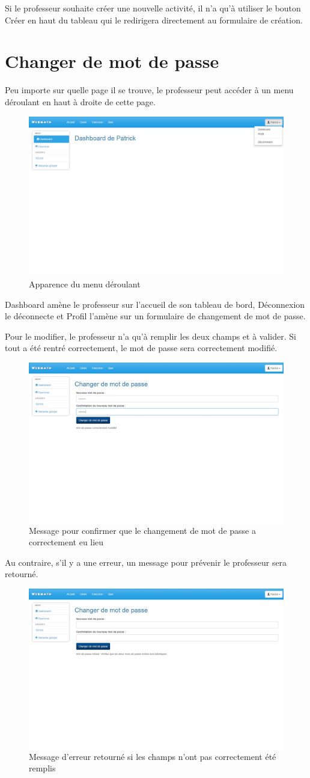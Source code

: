 \documentclass[a4paper,10pt,french]{sphinxmanual}
\begin{document}
Si le professeur souhaite créer une nouvelle activité, il n'a qu'à utiliser le
bouton Créer en haut du tableau qui le redirigera directement au formulaire de
création.


\section{Changer de mot de passe}
\label{dashboard:changer-de-mot-de-passe}
Peu importe sur quelle page il se trouve, le professeur peut accéder à un menu
déroulant en haut à droite de cette page.
\begin{figure}[htbp]
\centering
\capstart

\includegraphics[width=0.500\linewidth]{menuDeroulant.jpg}
\caption{Apparence du menu déroulant}\end{figure}

Dashboard amène le professeur sur l'accueil de son tableau de bord, Déconnexion le
déconnecte et Profil l'amène sur un formulaire de changement de mot de passe.

Pour le modifier, le professeur n'a qu'à remplir les deux champs et à valider.
Si tout a été rentré correctement, le mot de passe sera correctement modifié.
\begin{figure}[htbp]
\centering
\capstart

\includegraphics[width=0.500\linewidth]{passwordSuccess.jpg}
\caption{Message pour confirmer que le changement de mot de passe a correctement eu
lieu}\end{figure}

Au contraire, s'il y a une erreur, un message pour prévenir le
professeur sera retourné.
\begin{figure}[htbp]
\centering
\capstart

\includegraphics[width=0.500\linewidth]{passwordFail.jpg}
\caption{Message d'erreur retourné si les champs n'ont pas correctement été remplis}\end{figure}
\end{document}
